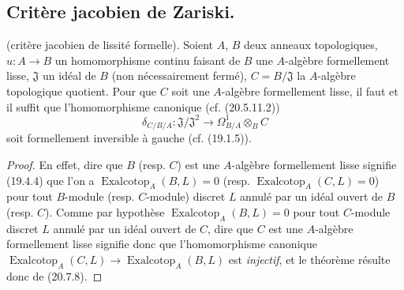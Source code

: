 \subsection{Critère jacobien de Zariski.}
\label{subsection:0.22.6-fr}

\begin{theorem}[22.6.1]
\label{0.22.6.1-fr}
\textnormal{(critère jacobien de lissité formelle).}
Soient $A$, $B$ deux anneaux topologiques,
$u:A\longrightarrow B$ un homomorphisme continu faisant de $B$ une
$A$-algèbre \textup{formellement lisse}, $\mathfrak J$ un idéal de $B$ (non
nécessairement fermé), $C=B/\mathfrak J$ la $A$-algèbre topologique quotient.
Pour que $C$ soit une $A$-algèbre formellement lisse, il faut et il suffit que
l'homomorphisme canonique \textup{(cf. (20.5.11.2))}
\begin{equation}
\label{0.22.6.1.1-fr}
  \delta_{C/B/A}:\mathfrak J/\mathfrak J^2
  \longrightarrow\Omega^1_{B/A}\otimes_BC
  \tag{22.6.1.1}
\end{equation}
soit formellement inversible à gauche \textup{(cf. (19.1.5))}.
\end{theorem}

\begin{proof}
En effet, dire que $B$ (resp. $C$) est une $A$-algèbre formellement lisse
signifie (19.4.4) que l'on a
$\operatorname{Exalcotop}_A(B,L)=0$ (resp.
$\operatorname{Exalcotop}_A(C,L)=0$) pour tout $B$-module (resp. $C$-module)
discret $L$ annulé par un idéal ouvert de $B$ (resp. $C$). Comme par hypothèse
$\operatorname{Exalcotop}_A(B,L)=0$ pour tout $C$-module discret $L$ annulé
par un idéal ouvert de $C$, dire que $C$ est une $A$-algèbre formellement lisse
signifie donc que l'homomorphisme canonique
$\operatorname{Exalcotop}_A(C,L)\longrightarrow
\operatorname{Exalcotop}_A(B,L)$ est \emph{injectif}, et le théorème résulte donc de
(20.7.8).
\end{proof}

